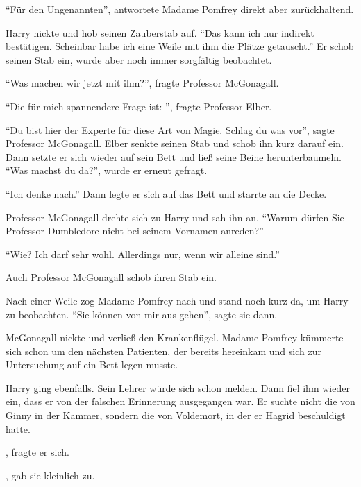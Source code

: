 \enquote{Für den Ungenannten}, antwortete Madame Pomfrey direkt aber zurückhaltend.

Harry nickte und hob seinen Zauberstab auf. \enquote{Das kann ich nur indirekt bestätigen. Scheinbar habe ich eine Weile mit ihm die Plätze getauscht.} Er schob seinen Stab ein, wurde aber noch immer sorgfältig beobachtet.

\enquote{Was machen wir jetzt mit ihm?}, fragte Professor McGonagall.

\enquote{Die für mich spannendere Frage ist: }, fragte Professor Elber.

\enquote{Du bist hier der Experte für diese Art von Magie. Schlag du was vor}, sagte Professor McGonagall. Elber senkte seinen Stab und schob ihn kurz darauf ein. Dann setzte er sich wieder auf sein Bett und ließ seine Beine herunterbaumeln. \enquote{Was machst du da?}, wurde er erneut gefragt.

\enquote{Ich denke nach.} Dann legte er sich auf das Bett und starrte an die Decke.

Professor McGonagall drehte sich zu Harry und sah ihn an. \enquote{Warum dürfen Sie Professor Dumbledore nicht bei seinem Vornamen anreden?}

\enquote{Wie? Ich darf sehr wohl. Allerdings nur, wenn wir alleine sind.}

Auch Professor McGonagall schob ihren Stab ein.

Nach einer Weile zog Madame Pomfrey nach und stand noch kurz da, um Harry zu beobachten. \enquote{Sie können von mir aus gehen}, sagte sie dann.

McGonagall nickte und verließ den Krankenflügel. Madame Pomfrey kümmerte sich schon um den nächsten Patienten, der bereits hereinkam und sich zur Untersuchung auf ein Bett legen musste.

Harry ging ebenfalls. Sein Lehrer würde sich schon melden. Dann fiel ihm wieder ein, dass er von der falschen Erinnerung ausgegangen war. Er suchte nicht die von Ginny in der Kammer, sondern die von Voldemort, in der er Hagrid beschuldigt hatte.

, fragte er sich.

, gab sie kleinlich zu.



